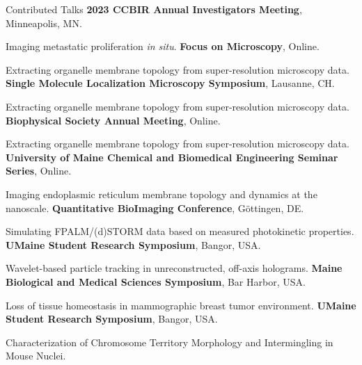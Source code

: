\begin{rubric}{Contributed Talks}
\entry*[2023]%
	\textbf{2023 CCBIR Annual Investigators Meeting}, Minneapolis, MN.\par Imaging metastatic proliferation \emph{in situ}.
%
\entry*[2022]%
	\textbf{Focus on Microscopy}, Online.\par Extracting organelle membrane topology from super-resolution microscopy data.
%
\entry*[2021]%
	\textbf{Single Molecule Localization Microscopy Symposium}, Lausanne,
CH.\par Extracting organelle membrane topology from super-resolution microscopy data.
%
\entry*[2021]%
	\textbf{Biophysical Society Annual Meeting}, Online.\par Extracting organelle membrane topology from super-resolution microscopy data.
%
\entry*[2020]%
	\textbf{University of Maine Chemical and Biomedical Engineering Seminar
Series}, Online.\par Imaging endoplasmic reticulum membrane topology and dynamics at the nanoscale.
%
\entry*[2018]%
	\textbf{Quantitative BioImaging Conference}, G\"{o}ttingen, DE.\par Simulating FPALM/(d)STORM data based on measured photokinetic properties.
%
\entry*[2017]%
	\textbf{UMaine Student Research Symposium}, Bangor, USA.\par Wavelet-based particle tracking in unreconstructed, off-axis holograms.
%
\entry*[2016]%
	\textbf{Maine Biological and Medical Sciences Symposium}, Bar Harbor, USA.\par Loss of tissue homeostasis in mammographic breast tumor environment. 
%
\entry*[2016]%
	\textbf{UMaine Student Research Symposium}, Bangor, USA.\par Characterization of Chromosome Territory Morphology and Intermingling in Mouse Nuclei.
%
\end{rubric}